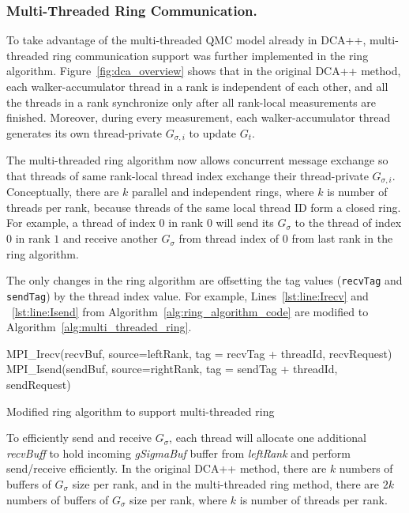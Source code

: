 \subsubsection{Multi-Threaded Ring Communication.}
\label{subsec:multi-thread}
To take advantage of the multi-threaded QMC model already in DCA++, 
multi-threaded ring communication support was further implemented in the ring algorithm.
%
Figure~\ref{fig:dca_overview} shows that in the original DCA++ method,
each walker-accumulator
thread in a rank is independent of each other, and all the threads in a 
rank synchronize only after all rank-local measurements are finished.
%
Moreover, during every measurement, each walker-accumulator thread
generates its own thread-private $G_{\sigma, i}$ to update $G_t$. 
%

The multi-threaded ring algorithm now allows concurrent message exchange so that threads of same rank-local thread index exchange their thread-private $G_{\sigma, i}$. 
%
Conceptually, there are $k$ parallel and independent rings, where $k$ 
is number of threads per rank, because threads of the same local thread ID
form a closed ring. 
%
For example, a thread of index $0$ in rank $0$ will send its $G_\sigma$ to 
the thread of index $0$ in rank $1$ and receive another $G_\sigma$ from thread index of $0$ 
from last rank in the ring algorithm.
%

The only changes in the ring algorithm are offsetting the tag values 
(\texttt{recvTag} and \texttt{sendTag}) by the thread index value. For example,
Lines~\ref{lst:line:Irecv} and ~\ref{lst:line:Isend} from 
Algorithm~\ref{alg:ring_algorithm_code} are modified to Algorithm~\ref{alg:multi_threaded_ring}.

\LinesNumberedHidden
\begin{algorithm}
        MPI\_Irecv(recvBuf, source=leftRank, tag = recvTag + threadId, recvRequest)\; 
        MPI\_Isend(sendBuf, source=rightRank, tag = sendTag + threadId, sendRequest)\;
\caption{Modified ring algorithm to support multi-threaded ring}
\label{alg:multi_threaded_ring}
\end{algorithm}

To efficiently send and receive $G_\sigma$, each thread
will allocate one additional \textit{recvBuff} to hold incoming 
\textit{gSigmaBuf} buffer from \textit{leftRank} and perform send/receive efficiently.
%
In the original DCA++ method, there are $k$ numbers of buffers of $G_\sigma$ 
size per rank, and in the multi-threaded ring method, there are $2k$
numbers of buffers of $G_\sigma$ size per rank, where $k$ is number of 
threads per rank.
